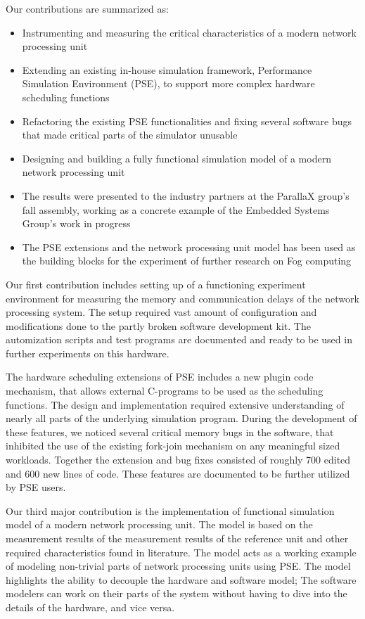 Our contributions are summarized as:
\begin{itemize}
\item Instrumenting and measuring the critical characteristics of a modern network processing unit
\item Extending an existing in-house simulation framework, Performance Simulation Environment (PSE), to support more complex hardware scheduling functions
\item Refactoring the existing PSE functionalities and fixing several software bugs that made critical parts of the simulator unusable
\item Designing and building a fully functional simulation model of a modern network processing unit
\item The results were presented to the industry partners at the ParallaX group's fall assembly, working as a concrete example of the Embedded Systems Group's work in progress
\item The PSE extensions and the network processing unit model has been used as the building blocks for the experiment of further research on Fog computing
\end{itemize}

Our first contribution includes setting up of a functioning experiment environment for measuring the memory and communication delays of the network processing system. The setup required vast amount of configuration and modifications done to the partly broken software development kit. The automization scripts and test programs are documented and ready to be used in further experiments on this hardware.

The hardware scheduling extensions of PSE includes a new plugin code mechanism, that allows external C-programs to be used as the scheduling functions. The design and implementation required extensive understanding of nearly all parts of the underlying simulation program. During the development of these features, we noticed several critical memory bugs in the software, that inhibited the use of the existing fork-join mechanism on any meaningful sized workloads. Together the extension and bug fixes consisted of roughly 700 edited and 600 new lines of code. These features are documented to be further utilized by PSE users.

Our third major contribution is the implementation of functional simulation model of a modern network processing unit. The model is based on the measurement results of the measurement results of the reference unit and other required characteristics found in literature. The model acts as a working example of modeling non-trivial parts of network processing units using PSE. The model highlights the ability to decouple the hardware and software model; The software modelers can work on their parts of the system without having to dive into the details of the hardware, and vice versa.

